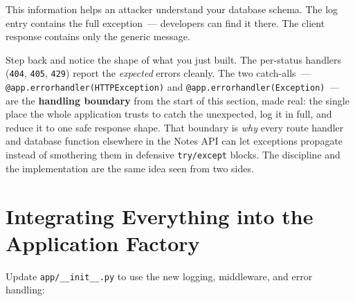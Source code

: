 \noindent{}This information helps an attacker understand your database schema. The log entry contains the full exception~--- developers can find it there. The client response contains only the generic message.

Step back and notice the shape of what you just built. The per-status handlers (\texttt{404}, \texttt{405}, \texttt{429}) report the \emph{expected} errors cleanly. The two catch-alls~--- \texttt{@app.}\allowbreak{}\texttt{errorhandler(HTTPException)} and \texttt{@app.}\allowbreak{}\texttt{errorhandler(Exception)}~--- are the \textbf{handling boundary} from the start of this section, made real: the single place the whole application trusts to catch the unexpected, log it in full, and reduce it to one safe response shape. That boundary is \emph{why} every route handler and database function elsewhere in the Notes API can let exceptions propagate instead of smothering them in defensive \texttt{try/except} blocks. The discipline and the implementation are the same idea seen from two sides.

\setcounter{section}{5}
\section{Integrating Everything into the Application Factory}\label{16-logging-error-handling:166-integrating-everything-into-the-application-factory}

Update \texttt{app/\_\_init\_\_.py} to use the new logging, middleware, and error handling:

